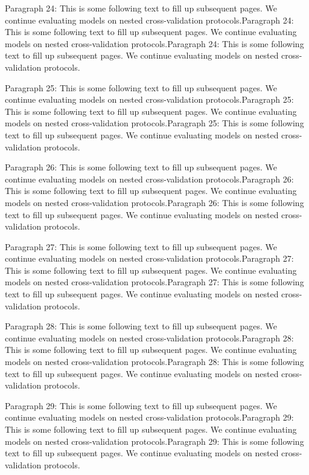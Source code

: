 \documentclass{IEEEtran}
\begin{document}
Paragraph 24: This is some following text to fill up subsequent pages. We continue evaluating models on nested cross-validation protocols.Paragraph 24: This is some following text to fill up subsequent pages. We continue evaluating models on nested cross-validation protocols.Paragraph 24: This is some following text to fill up subsequent pages. We continue evaluating models on nested cross-validation protocols.

Paragraph 25: This is some following text to fill up subsequent pages. We continue evaluating models on nested cross-validation protocols.Paragraph 25: This is some following text to fill up subsequent pages. We continue evaluating models on nested cross-validation protocols.Paragraph 25: This is some following text to fill up subsequent pages. We continue evaluating models on nested cross-validation protocols.

Paragraph 26: This is some following text to fill up subsequent pages. We continue evaluating models on nested cross-validation protocols.Paragraph 26: This is some following text to fill up subsequent pages. We continue evaluating models on nested cross-validation protocols.Paragraph 26: This is some following text to fill up subsequent pages. We continue evaluating models on nested cross-validation protocols.

Paragraph 27: This is some following text to fill up subsequent pages. We continue evaluating models on nested cross-validation protocols.Paragraph 27: This is some following text to fill up subsequent pages. We continue evaluating models on nested cross-validation protocols.Paragraph 27: This is some following text to fill up subsequent pages. We continue evaluating models on nested cross-validation protocols.

Paragraph 28: This is some following text to fill up subsequent pages. We continue evaluating models on nested cross-validation protocols.Paragraph 28: This is some following text to fill up subsequent pages. We continue evaluating models on nested cross-validation protocols.Paragraph 28: This is some following text to fill up subsequent pages. We continue evaluating models on nested cross-validation protocols.

Paragraph 29: This is some following text to fill up subsequent pages. We continue evaluating models on nested cross-validation protocols.Paragraph 29: This is some following text to fill up subsequent pages. We continue evaluating models on nested cross-validation protocols.Paragraph 29: This is some following text to fill up subsequent pages. We continue evaluating models on nested cross-validation protocols.
\end{document}
